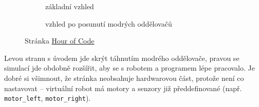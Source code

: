 \documentclass[../main.tex]{subfiles}
\begin{document}
	\begin{figure}[h!]%
		\begin{subfigure}{.49\textwidth}%
			\centering%
			\caption{základní vzhled}%
		\end{subfigure} \hspace{.05\textwidth}%
		\begin{subfigure}{.49\textwidth}%
			\centering%
			\caption{vzhled po posunutí modrých oddělovačů}%
		\end{subfigure}%
		\caption{Stránka \href{http://www.robotmesh.com/create/176384}{Hour of Code}}
	\end{figure}

	Levou stranu s úvodem jde skrýt táhnutím modrého oddělovače, pravou se simulací jde obdobně rozšířit, aby se s robotem a programem lépe pracovalo. Je dobré si všimnout, že stránka neobsahuje hardwarovou část, protože není co nastavovat -- virtuální robot má motory a senzory již předdefinované (např. \texttt{motor\_left}, \texttt{motor\_right}).
\end{document}
